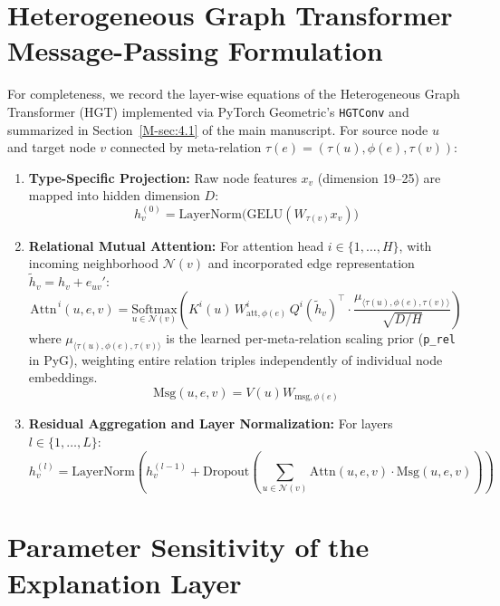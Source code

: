 \documentclass[preprint,3p]{elsarticle}
\begin{document}
\section{Heterogeneous Graph Transformer Message-Passing Formulation}
\label{supp:hgt}

For completeness, we record the layer-wise equations of the Heterogeneous Graph Transformer (HGT) \cite{hu2020hgt} implemented via PyTorch Geometric's \texttt{HGTConv} \cite{fey2019fast} and summarized in Section~\ref{M-sec:4.1} of the main manuscript. For source node $u$ and target node $v$ connected by meta-relation $\tau(e) = (\tau(u), \phi(e), \tau(v))$:
\begin{enumerate}
    \item \textbf{Type-Specific Projection:} Raw node features $x_v$ (dimension 19--25) are mapped into hidden dimension $D$:
    \begin{equation}
    h_v^{(0)} = \text{LayerNorm}\big(\text{GELU}(W_{\tau(v)} x_v)\big)
    \end{equation}
    \item \textbf{Relational Mutual Attention:} For attention head $i \in \{1, \dots, H\}$, with incoming neighborhood $\mathcal{N}(v)$ and incorporated edge representation $\tilde{h}_v = h_v + e_{uv}'$:
    \begin{equation}
    \text{Attn}^{\,i}(u, e, v) = \underset{u \in \mathcal{N}(v)}{\text{Softmax}}\left( K^i(u)\, W^i_{\text{att},\phi(e)}\, Q^i(\tilde{h}_v)^\top \cdot \frac{\mu_{\langle \tau(u), \phi(e), \tau(v)\rangle}}{\sqrt{D/H}} \right)
    \end{equation}
    where $\mu_{\langle \tau(u), \phi(e), \tau(v)\rangle}$ is the learned per-meta-relation scaling prior (\texttt{p\_rel} in PyG), weighting entire relation triples independently of individual node embeddings.
    \begin{equation}
    \text{Msg}(u, e, v) = V(u) W_{\text{msg},\phi(e)}
    \end{equation}
    \item \textbf{Residual Aggregation and Layer Normalization:} For layers $l \in \{1, \dots, L\}$:
    \begin{equation}
    h_v^{(l)} = \text{LayerNorm}\left( h_v^{(l-1)} + \text{Dropout}\left(\sum_{u \in \mathcal{N}(v)} \text{Attn}(u, e, v) \cdot \text{Msg}(u, e, v)\right)\right)
    \end{equation}
\end{enumerate}

\section{Parameter Sensitivity of the Explanation Layer}
\label{supp:params}
\end{document}
